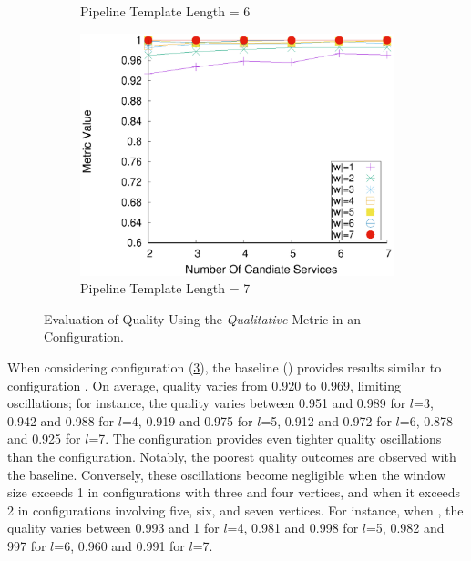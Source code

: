 \begin{figure}[ht!]
\begin{subfigure}{0.49\textwidth}
        \caption{Pipeline Template Length = 6}
        \label{fig:quality_window_average_qualitative_n6}
      \end{subfigure}
      \hfill
      \begin{subfigure}{0.49\textwidth}
        \includegraphics[width=\textwidth]{Images/graphs/window_quality_performance_diff_qual_n7_s7_50_80_n7}
        \caption{Pipeline Template Length = 7}
        \label{fig:quality_window_average_qualitative_n7}
      \end{subfigure}

      \caption{Evaluation of Quality Using the \emph{Qualitative} Metric in an \average Configuration.}
      \label{fig:quality_window_qualitative_average}

    \end{figure}

    When considering configuration \average (\cref{fig:quality_window_qualitative_average}), the baseline () provides results similar to configuration \wide. On average, quality varies from 0.920 to 0.969, limiting oscillations; for instance, the quality varies between 0.951 and 0.989 for $l$=3, 0.942 and 0.988 for $l$=4, 0.919 and 0.975 for $l$=5, 0.912 and 0.972 for $l$=6, 0.878 and 0.925 for $l$=7. The \average configuration provides even tighter quality oscillations than the \wide configuration. Notably, the poorest quality outcomes are observed with the baseline. Conversely, these oscillations become negligible when the window size exceeds 1 in configurations with three and four vertices, and when it exceeds 2 in configurations involving five, six, and seven vertices.  For instance, when , the quality varies between  0.993 and 1 for $l$=4, 0.981 and 0.998 for $l$=5, 0.982 and 997 for $l$=6, 0.960 and 0.991 for $l$=7.


